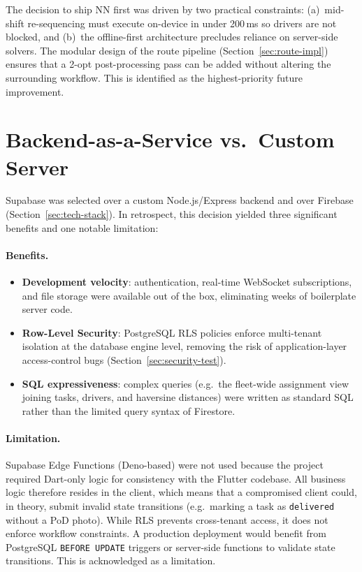 The decision to ship NN first was driven by two practical constraints:
(a)~mid-shift re-sequencing must execute on-device in under 200\,ms so
drivers are not blocked, and
(b)~the offline-first architecture precludes reliance on server-side solvers.
The modular design of the route pipeline (Section~\ref{sec:route-impl})
ensures that a 2-opt post-processing pass can be added without altering the
surrounding workflow. This is identified as the highest-priority future
improvement.

\section{Backend-as-a-Service vs.\ Custom Server}
\label{sec:disc-baas}

Supabase was selected over a custom Node.js/Express backend and over Firebase
(Section~\ref{sec:tech-stack}).  In retrospect, this decision yielded three
significant benefits and one notable limitation:

\paragraph{Benefits.}
\begin{itemize}
  \item \textbf{Development velocity}: authentication, real-time WebSocket
        subscriptions, and file storage were available out of the box,
        eliminating weeks of boilerplate server code.
  \item \textbf{Row-Level Security}: PostgreSQL RLS policies enforce
        multi-tenant isolation at the database engine level, removing the risk
        of application-layer access-control bugs
        (Section~\ref{sec:security-test}).
  \item \textbf{SQL expressiveness}: complex queries (e.g.\ the
        fleet-wide assignment view joining tasks, drivers, and haversine
        distances) were written as standard SQL rather than the limited
        query syntax of Firestore.
\end{itemize}

\paragraph{Limitation.}
Supabase Edge Functions (Deno-based) were not used because the project
required Dart-only logic for consistency with the Flutter codebase.  All
business logic therefore resides in the client, which means that a
compromised client could, in theory, submit invalid state transitions
(e.g.\ marking a task as \texttt{delivered} without a PoD photo).
While RLS prevents cross-tenant access, it does not enforce workflow
constraints.  A production deployment would benefit from PostgreSQL
\texttt{BEFORE UPDATE} triggers or server-side functions to validate state
transitions. This is acknowledged as a limitation.

